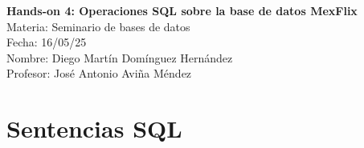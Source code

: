 \documentclass[12pt,a4paper]{article}
\begin{document}
\begin{titlepage}
    \centering
    \vspace*{4cm}
    \Huge{\textbf{Hands-on 4: Operaciones SQL sobre la base de datos MexFlix}}\\[1.5cm]
    \Large{Materia: Seminario de bases de datos\\[0.5cm]}
    \Large{Fecha: 16/05/25\\[0.5cm]}
    \Large{Nombre: Diego Martín Domínguez Hernández\\[2cm]}
    \Large{Profesor: José Antonio Aviña Méndez\\}
\end{titlepage}

\section{Sentencias SQL}
\end{document}
